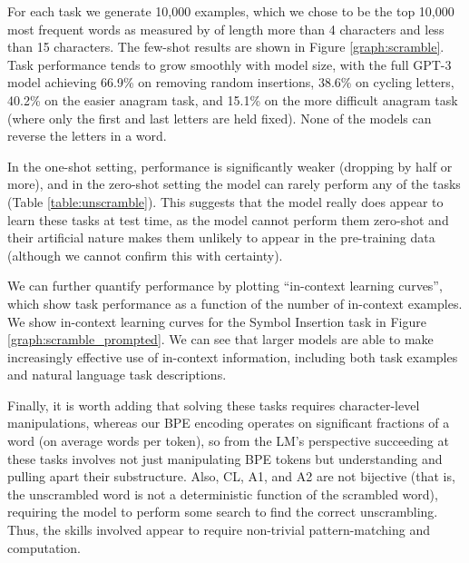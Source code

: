 \documentclass{article}
\begin{document}
For each task we generate 10,000 examples, which we chose to be the top 10,000 most frequent words as measured by \cite{norvig2009ngram} of length more than 4 characters and less than 15 characters. The few-shot results are shown in Figure \ref{graph:scramble}.  Task performance tends to grow smoothly with model size, with the full GPT-3 model achieving 66.9\% on removing random insertions, 38.6\% on cycling letters, 40.2\% on the easier anagram task, and 15.1\% on the more difficult anagram task (where only the first and last letters are held fixed).  None of the models can reverse the letters in a word. 

In the one-shot setting, performance is significantly weaker (dropping by half or more), and in the zero-shot setting the model can rarely perform any of the tasks (Table \ref{table:unscramble}).  This suggests that the model really does appear to learn these tasks at test time, as the model cannot perform them zero-shot and their artificial nature makes them unlikely to appear in the pre-training data (although we cannot confirm this with certainty).

We can further quantify performance by plotting ``in-context learning curves'', which show task performance as a function of the number of in-context examples.  We show in-context learning curves for the Symbol Insertion task in Figure \ref{graph:scramble_prompted}.  We can see that larger models are able to make increasingly effective use of in-context information, including both task examples and natural language task descriptions.

Finally, it is worth adding that solving these tasks requires character-level manipulations, whereas our BPE encoding operates on significant fractions of a word (on average  words per token), so from the LM’s perspective succeeding at these tasks involves not just manipulating BPE tokens but understanding and pulling apart their substructure. Also, CL, A1, and A2 are not bijective (that is, the unscrambled word is not a deterministic function of the scrambled word), requiring the model to perform some search to find the correct unscrambling. Thus, the skills involved appear to require non-trivial pattern-matching and computation.
         
\end{document}
